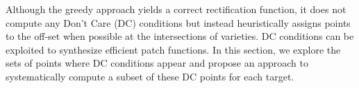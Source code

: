 
Although the greedy approach yields a correct rectification function, it does not compute any Don't Care (DC) conditions but instead heuristically assigns points to the off-set when possible at the intersections of varieties. 
DC conditions can be exploited to synthesize efficient patch functions. In this section, we explore the sets of points where DC conditions appear and propose an approach to systematically compute a subset of these DC points for each target.




